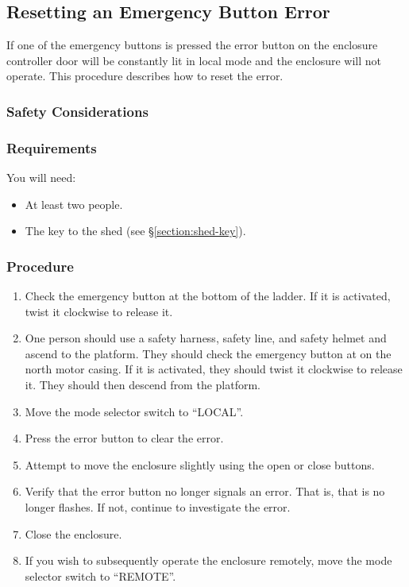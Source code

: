 \subsection{Resetting an Emergency Button Error}
\label{section:enclosure:reset-emergency-button}

If one of the emergency buttons is pressed the error button on the enclosure controller door will be constantly lit in local mode and the enclosure will not operate. This procedure describes how to reset the error.

\subsubsection{Safety Considerations}


\subsubsection{Requirements}

You will need:
\begin{itemize}
\item At least two people.
\item The key to the shed (see \S\ref{section:shed-key}).
\end{itemize}

\subsubsection{Procedure}

\begin{enumerate}
\item 
Check the emergency button at the bottom of the ladder. If it is activated, twist it clockwise to release it.
\item
One person should use a safety harness, safety line, and safety helmet and ascend to the platform. They should check the emergency button at on the north motor casing. If it is activated, they should twist it clockwise to release it. They should then descend from the platform.
\item
Move the mode selector switch to “LOCAL”.
\item
Press the error button to clear the error.
\item
Attempt to move the enclosure slightly using the open or close buttons.
\item
Verify that the error button no longer signals an error. That is, that is no longer flashes. If not, continue to investigate the error.
\item
Close the enclosure.
\item
If you wish to subsequently operate the enclosure remotely, move the mode selector switch to “REMOTE”.
\end{enumerate}

